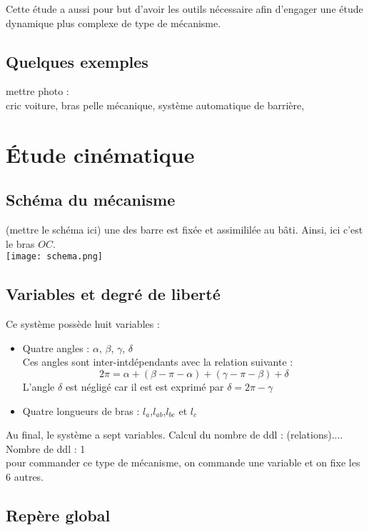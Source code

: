 \documentclass[12pt,a4paper]{article}
\begin{document}
\medbreak
Cette étude a aussi pour but d'avoir les outils nécessaire afin d'engager une étude dynamique plus complexe de type de mécanisme. 

\subsection{Quelques exemples}
mettre photo : \\
cric voiture, bras pelle mécanique, système automatique de barrière, 
\section{Étude cinématique}

\subsection{Schéma du mécanisme}
(mettre le schéma ici)
une des barre est fixée et assimililée au bâti. Ainsi, ici c'est le bras $OC$.\\

\texttt{[image: schema.png]}
\subsection{Variables et degré de liberté}
Ce système possède huit  variables :
\begin{itemize}
	\item Quatre angles : $\alpha$, $\beta$, $\gamma$, $\delta$\\
Ces angles sont inter-intdépendants avec la relation suivante : 
\begin{equation}
2 \pi = \alpha + (\beta - \pi - \alpha) + (\gamma - \pi - \beta)+ \delta
\end{equation}
L'angle $\delta$ est négligé car il est est exprimé par $\delta = 2\pi - \gamma$
	\item Quatre longueurs de bras : $l_a$,$l_{ab}$,$l_{bc}$ et $l_c$\\
\end{itemize}
Au final, le système a sept variables.
Calcul du nombre de ddl : (relations)....\\
Nombre de ddl : 1\\

pour commander ce type de mécanisme, on commande une variable et on fixe les 6 autres. 



\subsection{Repère global}
\end{document}

